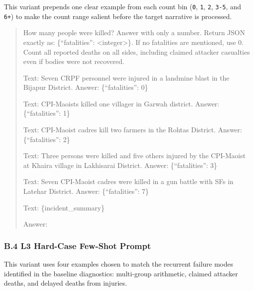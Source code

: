 \documentclass[
  11pt,
]{article}
\begin{document}
This variant prepends one clear example from each count bin (\texttt{0},
\texttt{1}, \texttt{2}, \texttt{3-5}, and \texttt{6+}) to make the count
range salient before the target narrative is processed.

\begin{quote}
How many people were killed? Answer with only a number. Return JSON
exactly as: \{``fatalities'': \textless integer\textgreater\}. If no
fatalities are mentioned, use 0. Count all reported deaths on all sides,
including claimed attacker casualties even if bodies were not recovered.

Text: Seven CRPF personnel were injured in a landmine blast in the
Bijapur District. Answer: \{``fatalities'': 0\}

Text: CPI-Maoists killed one villager in Garwah district. Answer:
\{``fatalities'': 1\}

Text: CPI-Maoist cadres kill two farmers in the Rohtas District. Answer:
\{``fatalities'': 2\}

Text: Three persons were killed and five others injured by the
CPI-Maoist at Khaira village in Lakhisarai District. Answer:
\{``fatalities'': 3\}

Text: Seven CPI-Maoist cadres were killed in a gun battle with SFs in
Latehar District. Answer: \{``fatalities'': 7\}

Text: \{incident\_summary\}

Answer:
\end{quote}

\subsubsection{B.4 L3 Hard-Case Few-Shot
Prompt}\label{b.4-l3-hard-case-few-shot-prompt}

This variant uses four examples chosen to match the recurrent failure
modes identified in the baseline diagnostics: multi-group arithmetic,
claimed attacker deaths, and delayed deaths from injuries.
\end{document}
